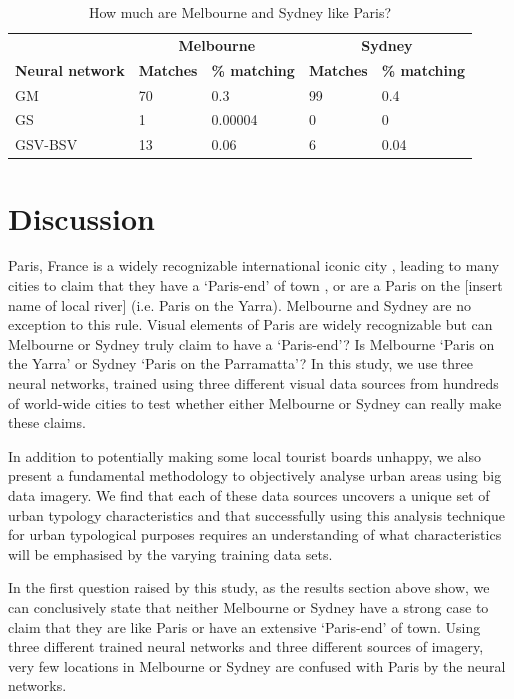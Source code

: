 \documentclass[sageh,times]{sagej}
\begin{document}
\begin{table}[!htbp]
\caption{How much are Melbourne and Sydney like Paris? \label{tab:melbournesydneyparis}}     
\begin{tabular}{ l  l l l  l}
 \hline    &  \multicolumn{2}{c}{\textbf{Melbourne}} & \multicolumn{2}{c}{\textbf{Sydney}}  \\  
\textbf{Neural network} & \textbf{Matches} & \textbf{\% matching}  & \textbf{Matches} & \textbf{\% matching}\\ \hline
GM & 70 & 0.3 & 99 & 0.4 \\ 
GS & 1 & 0.00004 & 0 & 0 \\ 
GSV-BSV & 13 & 0.06 & 6 & 0.04 \\ \hline

\end{tabular}
\end{table}









\section{Discussion}\label{sec:discussion}
Paris, France is a widely recognizable international iconic city \citep{Anholt2006}, leading to many cities to claim that they have a `Paris-end' of town \citep{Williams2010}, or are a Paris on the [insert name of local river] \citep{Wilden2013} (i.e. Paris on the Yarra). Melbourne and Sydney are no exception to this rule. Visual elements of Paris are widely recognizable \citep{Doersch2012} but can Melbourne or Sydney truly claim to have a `Paris-end'? Is Melbourne `Paris on the Yarra' or Sydney `Paris on the Parramatta'? In this study, we use three neural networks, trained using three different visual data sources from hundreds of world-wide cities to test whether either Melbourne or Sydney can really make these claims. 

In addition to potentially making some local tourist boards unhappy, we also present a fundamental methodology to objectively analyse urban areas using big data imagery. We find that each of these data sources uncovers a unique set of urban typology characteristics and that successfully using this analysis technique for urban typological purposes requires an understanding of what characteristics will be emphasised by the varying training data sets.

In the first question raised by this study, as the results section above show, we can conclusively state that neither Melbourne or Sydney have a strong case to claim that they are like Paris or have an extensive `Paris-end' of town. Using three different trained neural networks and three different sources of imagery, very few locations in Melbourne or Sydney are confused with Paris by the neural networks. 
\end{document}
